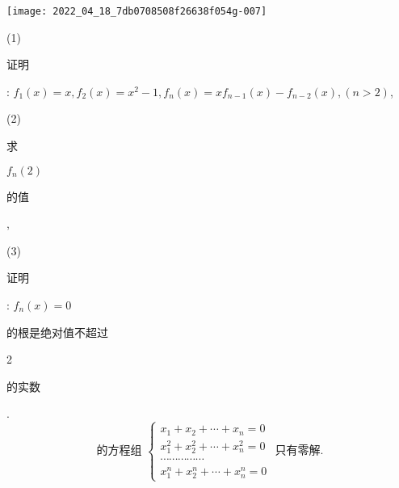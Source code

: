 \documentclass[10pt]{article}
\begin{document}
\texttt{[image: 2022\_04\_18\_7db0708508f26638f054g-007]}

(1) \begin{CJK}{UTF8}{mj}证明\end{CJK}: $f_{1}(x)=x, f_{2}(x)=x^{2}-1, f_{n}(x)=x f_{n-1}(x)-f_{n-2}(x),(n>2)$,

(2) \begin{CJK}{UTF8}{mj}求\end{CJK} $f_{n}(2)$ \begin{CJK}{UTF8}{mj}的值\end{CJK},

(3) \begin{CJK}{UTF8}{mj}证明\end{CJK}: $f_{n}(x)=0$ \begin{CJK}{UTF8}{mj}的根是绝对值不超过\end{CJK} 2 \begin{CJK}{UTF8}{mj}的实数\end{CJK}.
$$
\text { 的方程组 }\left\{\begin{array}{l}
x_{1}+x_{2}+\cdots+x_{n}=0 \\
x_{1}^{2}+x_{2}^{2}+\cdots+x_{n}^{2}=0 \\
\cdots \cdots \cdots \cdots \cdots \\
x_{1}^{n}+x_{2}^{n}+\cdots+x_{n}^{n}=0
\end{array}\right. \text { 只有零解. }
$$
\end{document}
